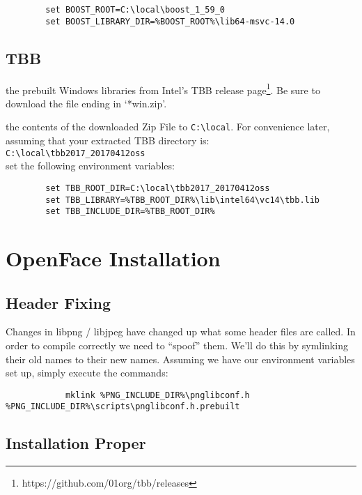 \documentclass{tufte-handout}
\begin{document}
    \begin{lstlisting}
        set BOOST_ROOT=C:\local\boost_1_59_0
        set BOOST_LIBRARY_DIR=%BOOST_ROOT%\lib64-msvc-14.0
    \end{lstlisting}

\subsection{TBB}

     the prebuilt Windows libraries from Intel's TBB release 
    page\footnote{https://github.com/01org/tbb/releases}.  Be sure to download the file ending
    in `*win.zip'.

     the contents of the downloaded Zip File to \Verb|C:\local|.  For
    convenience later, assuming that your extracted TBB directory is: \\
    \Verb|C:\local\tbb2017_20170412oss| \\
    set the following environment variables:

    \begin{lstlisting}
        set TBB_ROOT_DIR=C:\local\tbb2017_20170412oss
        set TBB_LIBRARY=%TBB_ROOT_DIR%\lib\intel64\vc14\tbb.lib
        set TBB_INCLUDE_DIR=%TBB_ROOT_DIR%
    \end{lstlisting}
        
\section{OpenFace Installation}

    \subsection{Header Fixing}
        
        Changes in libpng / libjpeg have changed up what some header files are called.  In order
        to compile correctly we need to ``spoof'' them.  We'll do this by symlinking their old
        names to their new names.  Assuming we have our environment variables set up, simply 
        execute the commands:

        \begin{lstlisting}
            mklink %PNG_INCLUDE_DIR%\pnglibconf.h %PNG_INCLUDE_DIR%\scripts\pnglibconf.h.prebuilt

        \end{lstlisting}

    \subsection{Installation Proper}
\end{document}
